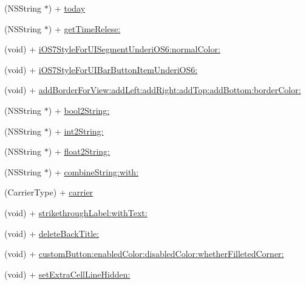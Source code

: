 \begin{DoxyCompactItemize}
\item 
(N\+S\+String $\ast$) + \hyperlink{interface_util_a520c05b4d750450e210ed4b88fcda50e}{today}
\item 
(N\+S\+String $\ast$) + \hyperlink{interface_util_a45977a2f8e7932f43fd76a93513fb512}{get\+Time\+Relese\+:}
\item 
(void) + \hyperlink{interface_util_a61a4994395b62cd42c2faca10ae495da}{i\+O\+S7\+Style\+For\+U\+I\+Segment\+Underi\+O\+S6\+:normal\+Color\+:}
\item 
(void) + \hyperlink{interface_util_ab14c5f425ea917696d72ed2369a7c801}{i\+O\+S7\+Style\+For\+U\+I\+Bar\+Button\+Item\+Underi\+O\+S6\+:}
\item 
(void) + \hyperlink{interface_util_a7c0668508791ceb7e589895bc4ac5e01}{add\+Border\+For\+View\+:add\+Left\+:add\+Right\+:add\+Top\+:add\+Bottom\+:border\+Color\+:}
\item 
(N\+S\+String $\ast$) + \hyperlink{interface_util_a2d310eb623bc9a372a47941ff21873fe}{bool2\+String\+:}
\item 
(N\+S\+String $\ast$) + \hyperlink{interface_util_a0d99f08d8339ca006b2d3a3174daae4d}{int2\+String\+:}
\item 
(N\+S\+String $\ast$) + \hyperlink{interface_util_a1a65d58902cd896dade73f0f00a84c76}{float2\+String\+:}
\item 
(N\+S\+String $\ast$) + \hyperlink{interface_util_a2893806d2f63d616bb8f560a4dba2bdd}{combine\+String\+:with\+:}
\item 
(Carrier\+Type) + \hyperlink{interface_util_a32b4fde4fc895aa25ba998a9a13534d7}{carrier}
\item 
(void) + \hyperlink{interface_util_a99984eed9d29c144d0a19c6c47077045}{strikethrough\+Label\+:with\+Text\+:}
\item 
(void) + \hyperlink{interface_util_af39c1facf595566b0fc0c80bc9700279}{delete\+Back\+Title\+:}
\item 
(void) + \hyperlink{interface_util_ae0150c5515eafe256ea70a4952b0b156}{custom\+Button\+:enabled\+Color\+:disabled\+Color\+:whether\+Filleted\+Corner\+:}
\item 
(void) + \hyperlink{interface_util_a171e52b6e5e08297da84f8cfc50ee882}{set\+Extra\+Cell\+Line\+Hidden\+:}
\end{DoxyCompactItemize}


